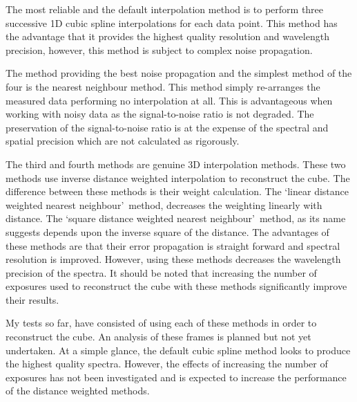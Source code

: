 \documentclass[a4paper,12pt]{article}
\begin{document}
The most reliable and the default interpolation method is to perform three successive 1D cubic spline interpolations for each data point. 
This method has the advantage that it provides the highest quality resolution and wavelength precision, however, this method is subject to complex noise propagation. 

The method providing the best noise propagation and the simplest method of the four is the nearest neighbour method. 
This method simply re-arranges the measured data performing no interpolation at all.
This is advantageous when working with noisy data as the signal-to-noise ratio is not degraded.
The preservation of the signal-to-noise ratio is at the expense of the spectral and spatial precision which are not calculated as rigorously.


The third and fourth methods are genuine 3D interpolation methods. 
These two methods use inverse distance weighted interpolation to reconstruct the cube. 
The difference between these methods is their weight calculation. 
The \textquoteleft linear distance weighted nearest neighbour\textquoteright ~method, decreases the weighting linearly with distance.
The \textquoteleft square distance weighted nearest neighbour\textquoteright ~method, as its name suggests depends upon the inverse square of the distance. 
The advantages of these methods are that their error propagation is straight forward and spectral resolution is improved.
However, using these methods decreases the wavelength precision of the spectra. 
It should be noted that increasing the number of exposures used to reconstruct the cube with these methods significantly improve their results. 

My tests so far, have consisted of using each of these methods in order to reconstruct the cube. 
An analysis of these frames is planned but not yet undertaken. 
At a simple glance, the default cubic spline method looks to produce the highest quality spectra.
However, the effects of increasing the number of exposures has not been investigated and is expected to increase the performance of the distance weighted methods. 



\end{document}
